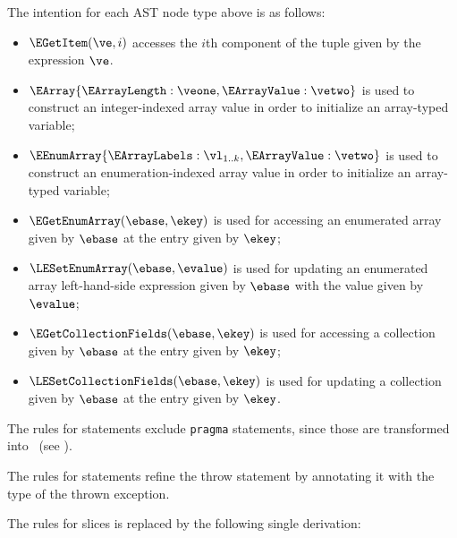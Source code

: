 The intention for each AST node type above is as follows:
\begin{itemize}
  \item $\EGetItem(\ve, i)$ accesses the $i$th component of the tuple given by
    the expression $\ve$.
  \item $\EArray\{\EArrayLength: \veone, \EArrayValue: \vetwo\}$ is used to
    construct an integer-indexed array value in order to initialize an
    array-typed variable;
  \item $\EEnumArray\{\EArrayLabels: \vl_{1..k}, \EArrayValue: \vetwo\}$ is used
    to construct an enumeration-indexed array value in order to initialize an
    array-typed variable;
  \item $\EGetEnumArray(\ebase, \ekey)$ is used for accessing an enumerated
    array given by $\ebase$ at the entry given by $\ekey$;
  \item $\LESetEnumArray(\ebase, \evalue)$ is used for updating an enumerated
    array left-hand-side expression given by $\ebase$ with the value given by
    $\evalue$;
  \item $\EGetCollectionFields(\ebase, \ekey)$ is used for accessing a
    collection given by $\ebase$ at the entry given by $\ekey$;
  \item $\LESetCollectionFields(\ebase, \ekey)$ is used for updating a
    collection given by $\ebase$ at the entry given by $\ekey$.
\end{itemize}

The rules for statements exclude \texttt{pragma} statements, since those are transformed into
\passstatementsterm\ (see ).

The rules for statements refine the throw statement by annotating it with
the type of the thrown exception.
\hypertarget{ast-typedSThrow}{}

The rules for slices is replaced by the following single derivation:
\hypertarget{ast-typedSliceLength}{}


